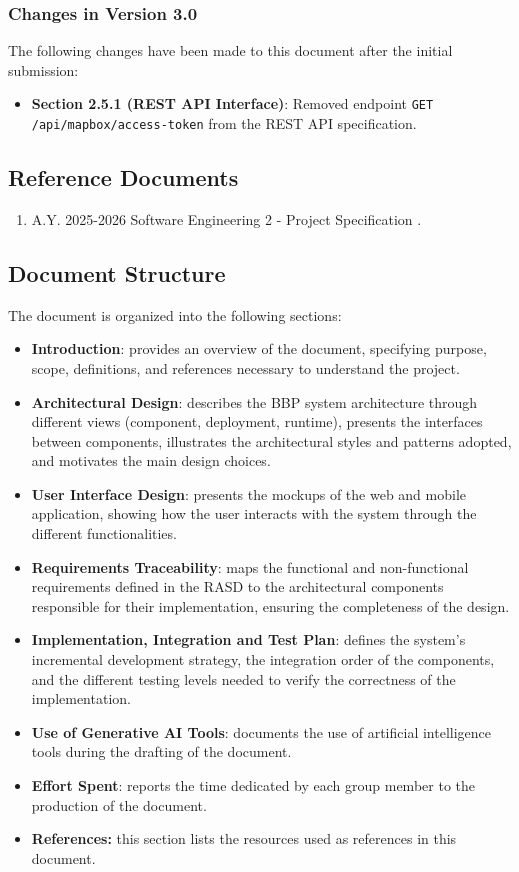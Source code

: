 \subsubsection{Changes in Version 3.0}
The following changes have been made to this document after the initial submission:
\begin{itemize}
    \item \textbf{Section 2.5.1 (REST API Interface)}: Removed endpoint \texttt{GET /api/mapbox/access-token} from the REST API specification.
\end{itemize}


\subsection{Reference Documents}
\begin{enumerate}
    \item A.Y. 2025-2026 Software Engineering 2 - Project Specification \cite{project_spec}.
\end{enumerate}

\subsection{Document Structure}
The document is organized into the following sections:
\begin{itemize}
    \item[] \textbf{Introduction}: provides an overview of the document, specifying purpose, scope, definitions, and references necessary to understand the project.
    \item[] \textbf{Architectural Design}: describes the BBP system architecture through different views (component, deployment, runtime), presents the interfaces between components, illustrates the architectural styles and patterns adopted, and motivates the main design choices.
    \item[] \textbf{User Interface Design}: presents the mockups of the web and mobile application, showing how the user interacts with the system through the different functionalities.
    \item[] \textbf{Requirements Traceability}: maps the functional and non-functional requirements defined in the RASD to the architectural components responsible for their implementation, ensuring the completeness of the design.
    \item[] \textbf{Implementation, Integration and Test Plan}: defines the system’s incremental development strategy, the integration order of the components, and the different testing levels needed to verify the correctness of the implementation.
    \item[] \textbf{Use of Generative AI Tools}: documents the use of artificial intelligence tools during the drafting of the document.
    \item[] \textbf{Effort Spent}: reports the time dedicated by each group member to the production of the document.
    \item[] \textbf{References:} this section lists the resources used as references in this document.
\end{itemize}
